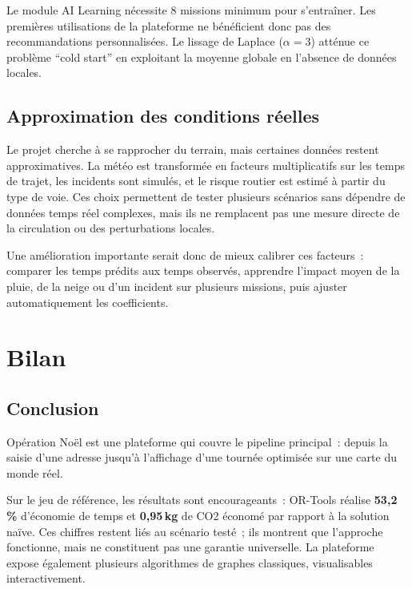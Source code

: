 \documentclass[a4paper, 12pt, twoside]{article}
\begin{document}
Le module AI Learning n\'{e}cessite 8 missions minimum pour s'entra\^{i}ner. Les premi\`{e}res
utilisations de la plateforme ne b\'{e}n\'{e}ficient donc pas des recommandations personnalis\'{e}es.
Le lissage de Laplace ($\alpha = 3$) att\'{e}nue ce probl\`{e}me ``cold start'' en exploitant
la moyenne globale en l'absence de donn\'{e}es locales.

\subsection{Approximation des conditions r\'{e}elles}

Le projet cherche \`{a} se rapprocher du terrain, mais certaines donn\'{e}es restent
approximatives. La m\'{e}t\'{e}o est transform\'{e}e en facteurs multiplicatifs sur les temps
de trajet, les incidents sont simul\'{e}s, et le risque routier est estim\'{e} \`{a} partir
du type de voie. Ces choix permettent de tester plusieurs sc\'{e}narios sans d\'{e}pendre
de donn\'{e}es temps r\'{e}el complexes, mais ils ne remplacent pas une mesure directe de
la circulation ou des perturbations locales.

Une am\'{e}lioration importante serait donc de mieux calibrer ces facteurs~: comparer les
temps pr\'{e}dits aux temps observ\'{e}s, apprendre l'impact moyen de la pluie, de la neige
ou d'un incident sur plusieurs missions, puis ajuster automatiquement les coefficients.

\section{Bilan}

\subsection{Conclusion}

Op\'{e}ration No\"{e}l est une plateforme qui couvre le pipeline principal~:
depuis la saisie d'une adresse jusqu'\`{a} l'affichage d'une tourn\'{e}e optimis\'{e}e
sur une carte du monde r\'{e}el.

Sur le jeu de r\'{e}f\'{e}rence, les r\'{e}sultats sont encourageants~: OR-Tools r\'{e}alise
\textbf{53,2\,\%} d'\'{e}conomie de temps et \textbf{0,95\,kg} de CO2 \'{e}conom\'{e} par rapport
\`{a} la solution na\"ive. Ces chiffres restent li\'{e}s au sc\'{e}nario test\'{e}~; ils montrent
que l'approche fonctionne, mais ne constituent pas une garantie universelle. La plateforme
expose \'{e}galement plusieurs algorithmes de graphes classiques, visualisables interactivement.
\end{document}
